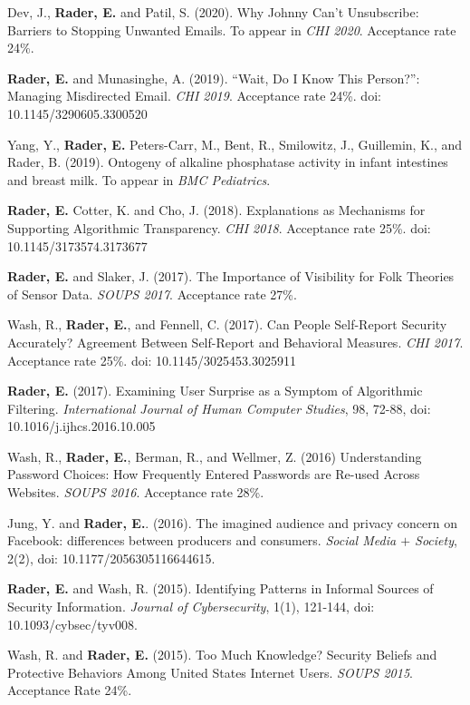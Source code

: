 \documentclass[9pt]{extarticle}
\begin{document}
Dev, J., \textbf{Rader, E.} and Patil, S. (2020). Why Johnny Can't Unsubscribe: Barriers to Stopping Unwanted Emails. To appear in \emph{CHI 2020}. Acceptance rate 24\%. 

\textbf{Rader, E.} and Munasinghe, A. (2019). ``Wait, Do I Know This Person?'': Managing Misdirected Email.  \emph{CHI 2019}. Acceptance rate 24\%. doi: 10.1145/3290605.3300520

Yang, Y., \textbf{Rader, E.} Peters-Carr, M., Bent, R., Smilowitz, J., Guillemin, K., and Rader, B. (2019). Ontogeny of alkaline phosphatase activity in infant intestines and breast milk. To appear in \emph{BMC Pediatrics}.

\textbf{Rader, E.} Cotter, K. and Cho, J. (2018). Explanations as Mechanisms for Supporting Algorithmic Transparency.  \emph{CHI 2018}. Acceptance rate 25\%. doi: 10.1145/3173574.3173677

\textbf{Rader, E.} and Slaker, J. (2017). The Importance of Visibility for Folk Theories of Sensor Data. \emph{SOUPS 2017}. Acceptance rate 27\%. 

Wash, R., \textbf{Rader, E.}, and Fennell, C. (2017). Can People Self-Report Security Accurately? Agreement Between Self-Report and Behavioral Measures. \emph{CHI 2017}. Acceptance rate 25\%. doi: 10.1145/3025453.3025911

\textbf{Rader, E.} (2017). Examining User Surprise as a Symptom of Algorithmic Filtering. \emph{International Journal of Human Computer Studies}, 98, 72-88, doi: 10.1016/j.ijhcs.2016.10.005

Wash, R., \textbf{Rader, E.}, Berman, R., and Wellmer, Z. (2016) Understanding Password Choices: How Frequently Entered Passwords are Re-used Across Websites. \emph{SOUPS 2016}. Acceptance rate 28\%.

Jung, Y. and \textbf{Rader, E.}. (2016). The imagined audience and privacy concern on Facebook: differences between producers and consumers. \emph{Social Media $+$ Society}, 2(2), doi: 10.1177/2056305116644615.

\textbf{Rader, E.} and Wash, R. (2015). Identifying Patterns in Informal Sources of Security Information. \emph{Journal of Cybersecurity}, 1(1), 121-144, doi: 10.1093/cybsec/tyv008.

Wash, R. and \textbf{Rader, E.} (2015). Too Much Knowledge? Security Beliefs and Protective Behaviors Among United States Internet Users. \emph{SOUPS 2015}. Acceptance Rate 24\%.
\end{document}
